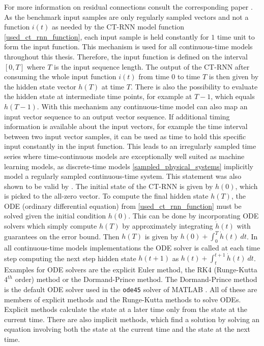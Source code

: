 \documentclass[draft,final]{vutinfth} %
\begin{document}
    For more information on residual connections consult the corresponding paper \cite{ResNet}.
    As the benchmark input samples are only regularly sampled vectors and not a function $i(t)$ as needed by the CT-RNN model function \ref{used_ct_rnn_function}, each input sample is held constantly for $1$ time unit to form the input function.
    This mechanism is used for all continuous-time models throughout this thesis.
    Therefore, the input function is defined on the interval $[0,T]$ where $T$ is the input sequence length.
    The output of the CT-RNN after consuming the whole input function $i(t)$ from time $0$ to time $T$ is then given by the hidden state vector $h(T)$ at time $T$.
    There is also the possibility to evaluate the hidden state at intermediate time points, for example at $T-1$, which equals $h(T-1)$.
    With this mechanism any continuous-time model can also map an input vector sequence to an output vector sequence.
    If additional timing information is available about the input vectors, for example the time interval between two input vector samples, it can be used as time to hold this specific input constantly in the input function.
    This leads to an irregularly sampled time series where time-continuous models are exceptionally well suited as machine learning models, as discrete-time models \ref{sampled_physical_systems} implicitly model a regularly sampled continuous-time system.
    This statement was also shown to be valid by \cite{ODELSTM}.
    The initial state of the CT-RNN is given by $h(0)$, which is picked to the all-zero vector.
    To compute the final hidden state $h(T)$, the ODE (ordinary differential equation) from \ref{used_ct_rnn_function} must be solved given the initial condition $h(0)$.
    This can be done by incorporating ODE solvers which simply compute $h(T)$ by approximately integrating $\dot h(t)$ with guarantees on the error bound.
    Then $h(T)$ is given by $h(0) + \int_0^T{\dot h(t)}~dt$. 
    In all continuous-time models implementations the ODE solver is called at each time step computing the next step hidden state $h(t+1)$ as $h(t) + \int_t^{t+1}{\dot h(t)}~dt$.
    Examples for ODE solvers are the explicit Euler method, the RK4 (Runge-Kutta $4^{th}$ order) method or the Dormand-Prince method.
    The Dormand-Prince method is the default ODE solver used in the \texttt{ode45} solver of MATLAB \cite{MATLAB}.
    All of these are members of explicit methods and the Runge-Kutta methods to solve ODEs. Explicit methods calculate the state at a later time only from the state at the current time.
    There are also implicit methods, which find a solution by solving an equation involving both the state at the current time and the state at the next time.
\end{document}
